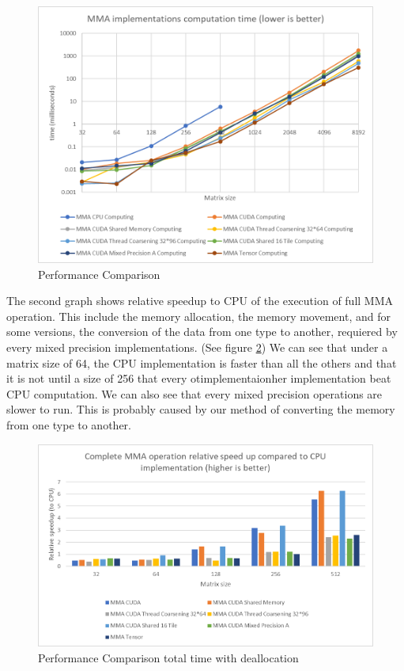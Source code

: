 \documentclass[conference]{IEEEtran}
\begin{document}
  \begin{figure}[h]
    \centering
    \includegraphics[scale=0.5]{figures/Comp_time_2.png}
    \caption{Performance Comparison}
    \label{fig:performance-comparison}
  \end{figure}

  The second graph shows relative speedup to CPU of the execution of full MMA operation. 
  This include the memory allocation, the memory movement, and for some versions,
  the conversion of the data from one type to another, requiered by every mixed precision
  implementations. (See figure \ref{fig:time-comparison})
  We can see that under a matrix size of 64, the CPU implementation is faster than all the others
  and that it is not until a size of 256 that every otimplementaionher implementation beat CPU computation.
  We can also see that every mixed precision operations are slower to run. This is probably caused by
  our method of converting the memory from one type to another.


  \begin{figure}[h]
    \centering
    \includegraphics[scale=0.5]{figures/Tot_time_relative_speedup.png}
    \caption{Performance Comparison total time with deallocation}
    \label{fig:time-comparison}
  \end{figure}
\end{document}

